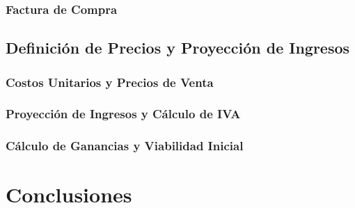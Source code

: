 \documentclass[12pt]{article}
\begin{document}
        \subsubsection{Factura de Compra}
    \subsection{Definición de Precios y Proyección de Ingresos}
        \subsubsection{Costos Unitarios y Precios de Venta}
        \subsubsection{Proyección de Ingresos y Cálculo de IVA}
        \subsubsection{Cálculo de Ganancias y Viabilidad Inicial}
        \newpage
   
\section{Conclusiones} %
\end{document}
